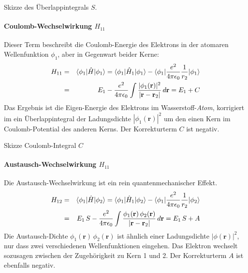\begin{marginfigure}

\caption{Skizze des  Überlappintegrals $S$. }
\end{marginfigure}


\paragraph{Coulomb-Wechselwirkung $H_{11}$}  Dieser Term beschreibt die Coulomb-Energie des Elektrons in der atomaren Wellenfunktion $\phi_1$, aber in Gegenwart beider Kerne:
\begin{eqnarray}
H_{11} &= &  \braket{\phi_1 | \hat{H} | \phi_1} = \braket{\phi_1 | \hat{H}_1 | \phi_1}  - \braket{\phi_1 |  \frac{e^2}{4 \pi \epsilon_0} \frac{1}{r_{2}} | \phi_1}  \\
 & = & E_1 - \frac{e^2}{4 \pi \epsilon_0} \int \frac{|\phi_1(\mathbf{r})|^2 }{|\mathbf{r} - \mathbf{r}_2  |} \, d\mathbf{r} = E_1 + C
\end{eqnarray}
Das Ergebnis ist die Eigen-Energie des Elektrons im Wasserstoff-\emph{Atom}, korrigiert im ein Überlappintegral der Ladungsdichte ${|\phi_1(\mathbf{r})|^2 }$ um den einen Kern im Coulomb-Potential des anderen Kerns. Der Korrekturterm $C$ ist negativ.

\begin{marginfigure}

\caption{Skizze Coulomb-Integral $C$ }
\end{marginfigure}


\paragraph{Austausch-Wechselwirkung $H_{11}$} Die Austausch-Wechselwirkung ist ein rein quantenmechanischer Effekt.
\begin{eqnarray}
H_{12} &= &  \braket{\phi_1 | \hat{H} | \phi_2} = \braket{\phi_1 | \hat{H}_1 | \phi_2}  - \braket{\phi_1 |  \frac{e^2}{4 \pi \epsilon_0} \frac{1}{r_{2}} | \phi_2}  \\
 & = & E_1 \, S - \frac{e^2}{4 \pi \epsilon_0} \int \frac{ \phi_1(\mathbf{r}) \, \phi_2(\mathbf{r})  }{|\mathbf{r} - \mathbf{r}_2  |} \, d\mathbf{r} = E_1 \, S + A
\end{eqnarray}
Die Austausch-Dichte $\phi_1(\mathbf{r}) \, \phi_2(\mathbf{r})$ ist ähnlich einer Ladungsdichte $|\phi(\mathbf{r})|^2$, nur dass zwei verschiedenen Wellenfunktionen eingehen. Das Elektron wechselt sozusagen zwischen der Zugehörigkeit zu Kern 1 und 2. Der Korrekturterm $A$ ist ebenfalls negativ.

